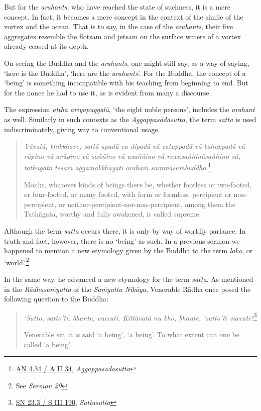 But for the \emph{arahants}, who have reached the state of suchness, it is a mere concept. In fact, it becomes a mere concept in the context of the simile of the vortex and the ocean. That is to say, in the case of the \emph{arahants}, their five aggregates resemble the flotsam and jetsam on the surface waters of a vortex already ceased at its depth.

On seeing the Buddha and the \emph{arahants}, one might still say, as a way of saying, `here is the Buddha', `here are the \emph{arahants}'. For the Buddha, the concept of a `being' is something incompatible with his teaching from beginning to end. But for the nonce he had to use it, as is evident from many a discourse.

The expression \emph{aṭṭha ariyapuggalā}, `the eight noble persons', includes the \emph{arahant} as well. Similarly in such contexts as the \emph{Aggappasādasutta}, the term \emph{satta} is used indiscriminately, giving way to conventional usage.

\begin{quote}
\emph{Yāvatā, bhikkhave, sattā apadā va dipadā vā catuppadā vā bahuppadā vā rūpino vā arūpino vā saññino vā asaññino vā nevasaññināsaññino vā, tathāgato tesaṁ aggamakkhāyati arahaṁ sammāsambuddho.}\footnote{\href{https://suttacentral.net/an4.34/pli/ms}{AN 4.34 / A II 34}, \emph{Aggappasādasutta}}

Monks, whatever kinds of beings there be, whether footless or two-footed, or four-footed, or many footed, with form or formless, percipient or non-percipient, or neither-percipient-nor-non-percipient, among them the Tathāgata, worthy and fully awakened, is called supreme.
\end{quote}

Although the term \emph{satta} occurs there, it is only by way of worldly parlance. In truth and fact, however, there is no `being' as such. In a previous sermon we happened to mention a new etymology given by the Buddha to the term \emph{loka}, or `world'.\footnote{See \emph{Sermon 20}}

In the same way, he advanced a new etymology for the term \emph{satta}. As mentioned in the \emph{Rādhasaṁyutta} of the \emph{Saṁyutta Nikāya}, Venerable Rādha once posed the following question to the Buddha:

\begin{quote}
\emph{`Satto, satto'ti, bhante, vuccati. Kittāvatā nu kho, bhante, `satto'ti vuccati?}\footnote{\href{https://suttacentral.net/sn23.3/pli/ms}{SN 23.3 / S III 190}, \emph{Sattasutta}}

Venerable sir, it is said `a being', `a being'. To what extent can one be called `a being'.
\end{quote}


